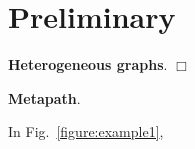 \section{Preliminary}
\label{sec:pre}

\begin{definition}
\textbf{ Heterogeneous graphs}. 
\hfill$\Box$
\end{definition}

\begin{example}
\end{example}

\begin{definition}
\textbf{Metapath}. 
\end{definition}

\begin{example}
In Fig.~\ref{figure:example1},
\end{example}











